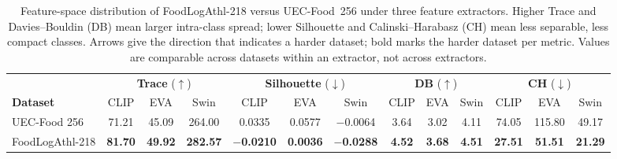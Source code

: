 \begin{table}[t]
  \centering
  \caption{Feature-space distribution of FoodLogAthl-218 versus UEC-Food~256 under three feature extractors. Higher Trace and Davies--Bouldin (DB) mean larger intra-class spread; lower Silhouette and Calinski--Harabasz (CH) mean less separable, less compact classes. Arrows give the direction that indicates a harder dataset; bold marks the harder dataset per metric. Values are comparable across datasets within an extractor, not across extractors.}
  \label{tab:diversity}
  \small
  \setlength{\tabcolsep}{3pt}
  \begin{tabular}{@{}l ccc ccc ccc ccc@{}}
    \toprule
    & \multicolumn{3}{c}{\textbf{Trace} ($\uparrow$)} & \multicolumn{3}{c}{\textbf{Silhouette} ($\downarrow$)} & \multicolumn{3}{c}{\textbf{DB} ($\uparrow$)} & \multicolumn{3}{c}{\textbf{CH} ($\downarrow$)} \\
    \cmidrule(lr){2-4}\cmidrule(lr){5-7}\cmidrule(lr){8-10}\cmidrule(l){11-13}
    \textbf{Dataset} & CLIP & EVA & Swin & CLIP & EVA & Swin & CLIP & EVA & Swin & CLIP & EVA & Swin \\
    \midrule
    UEC-Food 256    & 71.21 & 45.09 & 264.00 & 0.0335 & 0.0577 & $-$0.0064 & 3.64 & 3.02 & 4.11 & 74.05 & 115.80 & 49.17 \\
    FoodLogAthl-218 & \textbf{81.70} & \textbf{49.92} & \textbf{282.57} & \textbf{$-$0.0210} & \textbf{0.0036} & \textbf{$-$0.0288} & \textbf{4.52} & \textbf{3.68} & \textbf{4.51} & \textbf{27.51} & \textbf{51.51} & \textbf{21.29} \\
    \bottomrule
  \end{tabular}
\end{table}

